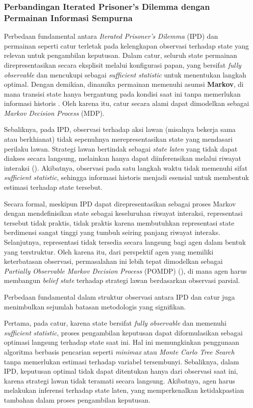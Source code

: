 \subsubsection{Perbandingan Iterated Prisoner's Dilemma dengan Permainan Informasi Sempurna}

Perbedaan fundamental antara \textit{Iterated Prisoner's Dilemma} (IPD) dan permainan seperti catur terletak pada kelengkapan observasi terhadap state yang relevan untuk pengambilan keputusan. Dalam catur, seluruh state permainan direpresentasikan secara eksplisit melalui konfigurasi papan, yang bersifat \textit{fully observable} dan mencukupi sebagai \textit{sufficient statistic} untuk menentukan langkah optimal. Dengan demikian, dinamika permainan memenuhi asumsi \textbf{Markov}, di mana transisi state hanya bergantung pada kondisi saat ini tanpa memerlukan informasi historis \cite{russell_artificial_2016}. Oleh karena itu, catur secara alami dapat dimodelkan sebagai \textit{Markov Decision Process} (MDP).

Sebaliknya, pada IPD, observasi terhadap aksi lawan (misalnya bekerja sama atau berkhianat) tidak sepenuhnya merepresentasikan state yang mendasari perilaku lawan. Strategi lawan bertindak sebagai \textit{state laten} yang tidak dapat diakses secara langsung, melainkan hanya dapat diinferensikan melalui riwayat interaksi (\cite{axelrod_evolution_1981}). Akibatnya, observasi pada satu langkah waktu tidak memenuhi sifat \textit{sufficient statistic}, sehingga informasi historis menjadi esensial untuk membentuk estimasi terhadap state tersebut.

Secara formal, meskipun IPD dapat direpresentasikan sebagai proses Markov dengan mendefinisikan state sebagai keseluruhan riwayat interaksi, representasi tersebut tidak praktis, tidak praktis karena membutuhkan representasi state berdimensi sangat tinggi yang tumbuh seiring panjang riwayat interaks. Selanjutnya, representasi tidak tersedia secara langsung bagi agen dalam bentuk yang terstruktur. Oleh karena itu, dari perspektif agen yang memiliki keterbatasan observasi, permasalahan ini lebih tepat dimodelkan sebagai \textit{Partially Observable Markov Decision Process} (POMDP) (\cite{kaelbling_planning_1998}), di mana agen harus membangun \textit{belief state} terhadap strategi lawan berdasarkan observasi parsial.

Perbedaan fundamental dalam struktur observasi antara IPD dan catur juga menimbulkan sejumlah batasan metodologis yang signifikan.

Pertama, pada catur, karena state bersifat \textit{fully observable} dan memenuhi \textit{sufficient statistic}, proses pengambilan keputusan dapat diformulasikan sebagai optimasi langsung terhadap state saat ini. Hal ini memungkinkan penggunaan algoritma berbasis pencarian seperti \textit{minimax} atau \textit{Monte Carlo Tree Search} tanpa memerlukan estimasi terhadap variabel tersembunyi. Sebaliknya, dalam IPD, keputusan optimal tidak dapat ditentukan hanya dari observasi saat ini, karena strategi lawan tidak teramati secara langsung. Akibatnya, agen harus melakukan inferensi terhadap state laten, yang memperkenalkan ketidakpastian tambahan dalam proses pengambilan keputusan.

